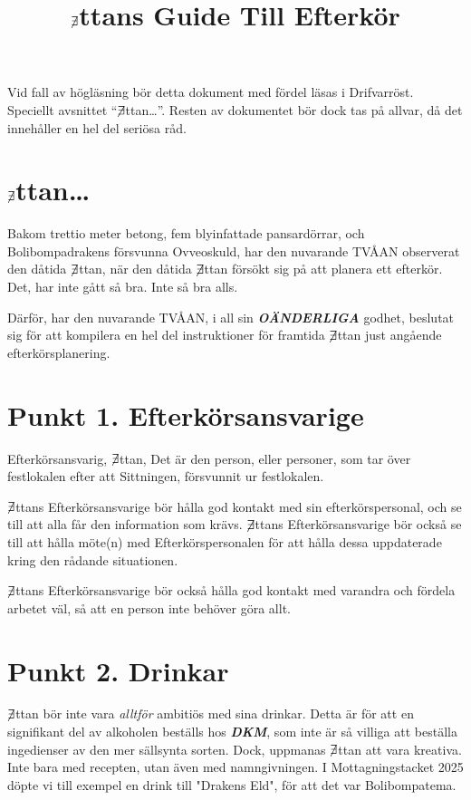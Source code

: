 \documentclass[a4paper, 12pt]{article}
\title{$\centernot\exists$ttans Guide Till Efterkör}
\date{}
\begin{document}
\maketitle

Vid fall av högläsning bör detta dokument med fördel läsas i Drifvarröst. Speciellt avsnittet ``$\centernot\exists$ttan\dots''. Resten av dokumentet bör dock tas på allvar, då det innehåller en hel del seriösa råd.

\section{$\centernot\exists$ttan\dots}

Bakom trettio meter betong, fem blyinfattade pansardörrar, och Bolibompadrakens försvunna Ovveoskuld, har den nuvarande TVÅAN observerat den dåtida $\centernot\exists$ttan, när den dåtida $\centernot\exists$ttan försökt sig på att planera ett efterkör. Det, har inte gått så bra. Inte så bra alls. 

Därför, har den nuvarande TVÅAN, i all sin \textit{\textbf{OÄNDERLIGA}} godhet, beslutat sig för att kompilera en hel del instruktioner för framtida $\centernot\exists$ttan just angående efterkörsplanering.

\section{Punkt 1. Efterkörsansvarige}

Efterkörsansvarig, $\centernot\exists$ttan, Det är den person, eller personer, som tar över festlokalen efter att Sittningen, försvunnit ur festlokalen. 

$\centernot\exists$ttans Efterkörsansvarige bör hålla god kontakt med sin efterkörspersonal, och se till att alla får den information som krävs. $\centernot\exists$ttans Efterkörsansvarige bör också se till att hålla möte(n) med Efterkörspersonalen för att hålla dessa uppdaterade kring den rådande situationen. 

$\centernot\exists$ttans Efterkörsansvarige bör också hålla god kontakt med varandra och fördela arbetet väl, så att en person inte behöver göra allt.

\section{Punkt 2. Drinkar}

$\centernot\exists$ttan bör inte vara \textit{alltför} ambitiös med sina drinkar. Detta är för att en signifikant del av alkoholen beställs hos \textit{\textbf{DKM}}, som inte är så villiga att beställa ingedienser av den mer sällsynta sorten. Dock, uppmanas $\centernot\exists$ttan att vara kreativa. Inte bara med recepten, utan även med namngivningen. I Mottagningstacket 2025 döpte vi till exempel en drink till "Drakens Eld", för att det var Bolibompatema.
\end{document}
